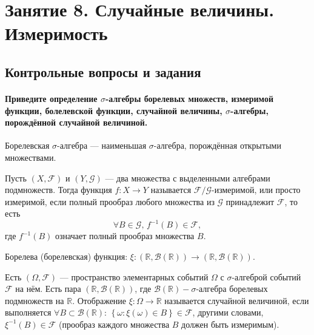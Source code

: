 \chapter*{Занятие 8. Случайные величины. Измеримость}

\section*{Контрольные вопросы и задания}

\subsubsection*{Приведите определение $ \sigma $-алгебры борелевых множеств, измеримой функции, болелевской функции, случайной величины, $ \sigma $-алгебры, порождённой случайной величиной.}

Борелевская $ \sigma $-алгебра --- наименьшая $ \sigma $-алгебра, порождённая открытыми множествами.

Пусть $ \left( X, \mathcal{F} \right) $ и $ \left( Y, \mathcal{G} \right) $ --- два множества с выделенными алгебрами подмножеств.
Тогда функция $f: X \rightarrow Y$ называется $ \mathcal{F} / \mathcal{G} $-измеримой, или просто измеримой,
если полный прообраз любого множества из $ \mathcal{G} $ принадлежит $ \mathcal{F} $, то есть
$$ \forall B \in \mathcal{G}, \,
f^{-1} \left( B \right) \in \mathcal{F},$$
где $f^{-1} \left( B \right) $ означает полный прообраз множества $B$.

Борелева (борелевская) функция:
$ \xi: \left( \mathbb{R}, \mathcal{B} \left( \mathbb{R} \right) \right) \rightarrow
\left( \mathbb{R}, \mathcal{B} \left( \mathbb{R} \right) \right) $.

Есть $ \left( \Omega, \mathcal{F} \right) $ --- пространство элементарных событий $ \Omega $ с $ \sigma $-алгеброй событий $ \mathcal{F} $ на нём.
Есть пара $ \left( \mathbb{R}, \mathcal{B} \left( \mathbb{R} \right) \right) $,
где $ \mathcal{B} \left( \mathbb{R} \right) - \sigma $-алгебра борелевых подмножеств на $ \mathbb{R} $.
Отображение $ \xi: \Omega \rightarrow \mathbb{R} $ называется случайной величиной, если выполняется $ \forall B \subset \mathcal{B} \left( \mathbb{R} \right): \, \left\{ \omega: \xi \left( \omega \right) \in B \right\} \in \mathcal{F} $, другими словами, $ \xi^{-1} \left( B \right) \in \mathcal{F} $ (прообраз каждого множества $B$ должен быть измеримым).

